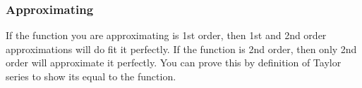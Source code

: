     \subsubsection{Approximating}
    \begin{intuition}
        If the function you are approximating is 1st order, then 1st and 2nd order approximations will do fit it perfectly. If the function is 2nd order, then only 2nd order will approximate it perfectly. You can prove this by definition of Taylor series to show its equal to the function. 
    \end{intuition}